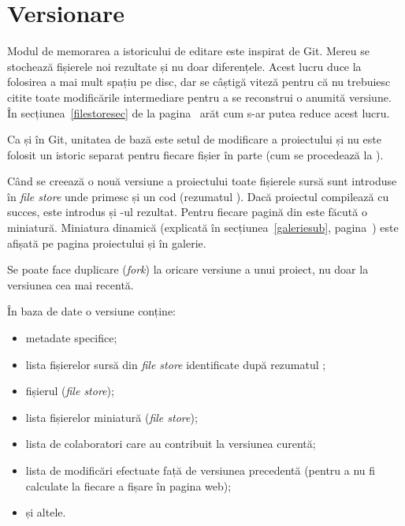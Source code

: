 \documentclass[a4wide,12pt]{report}
\newcommand{\eng}[1]{\emph{#1}} %
\newcommand{\acr}[1]{{\textsmaller[1]{\textsc{#1}}}} %
\begin{document}
\section{Versionare}

Modul de memorarea a istoricului de editare este inspirat de Git. Mereu se
stochează fișierele noi rezultate și nu doar diferențele. Acest lucru duce la
folosirea a mai mult spațiu pe disc, dar se câștigă viteză pentru că nu
trebuiesc citite toate modificările intermediare pentru a se reconstrui o
anumită versiune. În secțiunea~\ref{filestoresec} de la
pagina~\pageref{filestoresec} arăt cum s-ar putea reduce acest lucru.

Ca și în Git, unitatea de bază este setul de modificare a proiectului și nu este
folosit un istoric separat pentru fiecare fișier în parte (cum se procedează la
\acr{SVN}).

Când se creează o nouă versiune a proiectului toate fișierele sursă sunt
introduse în \eng{file store} unde primesc și un cod (rezumatul \acr{SHA1}).
Dacă proiectul compilează cu succes, este introdus și \acr{PDF}-ul rezultat.
Pentru fiecare pagină din \acr{PDF} este făcută o miniatură. Miniatura dinamică
(explicată în secțiunea~\ref{galeriesub}, pagina~\pageref{galeriesub}) este
afișată pe pagina proiectului și în galerie.

Se poate face duplicare (\eng{fork}) la oricare versiune a unui proiect, nu doar
la versiunea cea mai recentă.

În baza de date o versiune conține:

\begin{itemize}

\item metadate specifice;

\item lista fișierelor sursă din \eng{file store} identificate după rezumatul
\acr{SHA1};

\item fișierul \acr{PDF} (\eng{file store});

\item lista fișierelor miniatură (\eng{file store});

\item lista de colaboratori care au contribuit la versiunea curentă;

\item lista de modificări efectuate față de versiunea precedentă (pentru a nu fi
calculate la fiecare a fișare în pagina web);

\item și altele.

\end{itemize}
\end{document}
